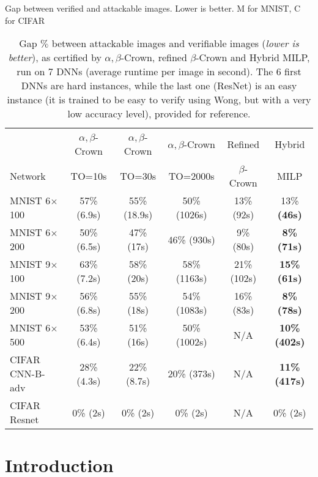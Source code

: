 \documentclass{article} %
\theoremstyle{definition}
\begin{document}
\vspace*{4ex}

Gap between verified and attackable images. Lower is better.
M for MNIST, C for CIFAR

\begin{table}
\centering
\begin{tabular}{||l||c|c|c|c||c||}
	\hline \hline
	 & $\alpha,\beta$-Crown & $\alpha,\beta$-Crown & $\alpha,\beta$-Crown & Refined & Hybrid \\ 
	 Network & TO=10s & TO=30s & TO=2000s & $\beta$-Crown & MILP \\ 
	\hline
	MNIST 6$\times$100 & 57\% (6.9s) & 55\% (18.9s) & 50\% (1026s) & 13\% 
	(92s) & 13\% \bf (46s) \\ \hline
	MNIST 6$\times$200 & 50\% (6.5s) & 47\% (17s) & 46\% (930s) & 9\% (80s) & \bf 8\% (71s) \\ \hline
	MNIST 9$\times$100 & 63\% (7.2s) & 58\% (20s) & 58\% (1163s) & 21\% (102s) & \bf 15\% (61s) \\ \hline
	MNIST 9$\times$200 & 56\% (6.8s) & 55\% (18s) & 54\% (1083s) & 16\% (83s) & \bf 8\% (78s) \\ \hline
	MNIST 6$\times$500 & 53\% (6.4s) & 51\% (16s) & 50\% (1002s) & N/A & 
	\bf 10\% (402s) \\ \hline
	CIFAR CNN-B-adv & 28\% (4.3s) & 22\% (8.7s) & 20\% (373s) & N/A & \bf 11\% (417s) \\ \hline \hline
	CIFAR Resnet & 0\% (2s) & 0\% (2s) & 0\% (2s) & N/A & 0\% (2s) \\ \hline \hline
\end{tabular}
\caption{Gap $\%$ between attackable images and verifiable images ({\em lower is better}), as certified by $\alpha,\beta$-Crown, refined $\beta$-Crown and Hybrid MILP, run on 7 DNNs (average runtime per image in second). The 6 first DNNs are hard instances, while the last one (ResNet) is an easy instance (it is trained to be easy to verify using Wong, but with a very low accuracy level), provided for reference.}
\label{table_hybrid}
\end{table}



	\section{Introduction}


%

\end{document}
